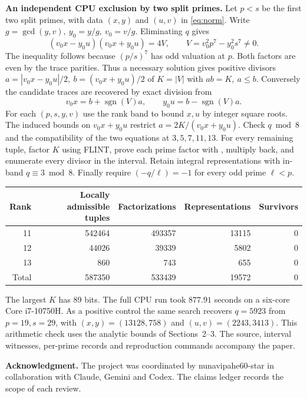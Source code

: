 \documentclass[11pt,letterpaper]{article}
\newcommand{\file}[1]{\texttt{\detokenize{#1}}}
\begin{document}
\newpage
\textbf{An independent CPU exclusion by two split primes.}
Let \(p<s\) be the first two split primes, with data \((x,y)\) and \((u,v)\)
in \eqref{eq:norm}. Write \(g=\gcd(y,v),\ y_0=y/g,\ v_0=v/g\).
Eliminating \(q\) gives
\[
 (v_0x-y_0u)(v_0x+y_0u)=4V,\qquad
 V=v_0^2p^7-y_0^2s^7\ne0 .
\]
The inequality follows because \((p/s)^7\) has odd valuation at \(p\).
Both factors are even by the trace parities. Thus a necessary solution
gives positive divisors \(a=|v_0x-y_0u|/2,\ b=(v_0x+y_0u)/2\) of
\(K=|V|\) with \(ab=K,\ a\le b\). Conversely the candidate traces are
recovered by exact division from
\[
 v_0x=b+\operatorname{sgn}(V)a,\qquad
 y_0u=b-\operatorname{sgn}(V)a .
\]
For each \((p,s,y,v)\) use the rank band to bound \(x,u\) by integer
square roots. The induced bounds on \(v_0x+y_0u\) restrict
\(a=2K/(v_0x+y_0u)\). Check \(q\bmod8\) and the compatibility of the
two equations at \(3,5,7,11,13\). For every remaining tuple, factor \(K\)
using FLINT, prove each prime factor with \file{is_prime}, multiply back,
and enumerate every divisor in the interval. Retain integral
representations with in-band \(q\equiv3\bmod8\). Finally require
\(({-q}/\ell)=-1\) for every odd prime \(\ell<p\).
\begin{center}
\begin{tabular}{@{}rrrrr@{}}
\toprule
Rank&Locally admissible tuples&Factorizations&Representations&Survivors\\
\midrule
11&542464&493357&13115&0\\
12&44026&39339&5802&0\\
13&860&743&655&0\\
\midrule
Total&587350&533439&19572&0\\
\bottomrule
\end{tabular}
\end{center}
The largest \(K\) has 89 bits. The full CPU run took \(877.91\) seconds
on a six-core Core i7-10750H. As a positive control the same search
recovers \(q=5923\) from \(p=19,s=29\), with
\((x,y)=(13128,758)\) and \((u,v)=(2243,3413)\).
This arithmetic check uses the analytic bounds of Sections~2--3.
The source, interval witnesses, per-prime records and reproduction commands
accompany the paper.

\textbf{Acknowledgment.}
The project was coordinated by nunavipahe60-star in collaboration with
Claude, Gemini and Codex. The claims ledger records the scope of each review.
\end{document}
